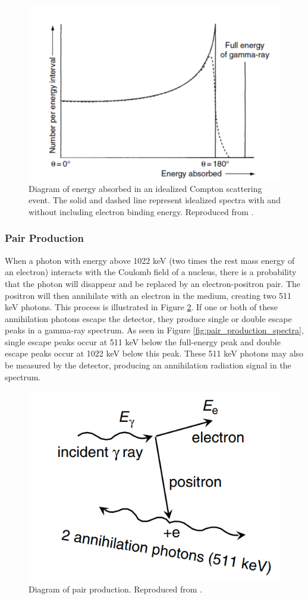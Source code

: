 \begin{figure}[H]
\centering
\includegraphics[width=0.75\linewidth]{images/ideal_compton}
\caption{Diagram of energy absorbed in an idealized Compton scattering event. The solid and dashed line represent idealized spectra with and without including electron binding energy. Reproduced from \cite{gilmore}.}
\label{fig:ideal_compton}
\end{figure}



\subsubsection{Pair Production}

When a photon with energy above 1022 keV (two times the rest mass energy of an electron) interacts with the Coulomb field of a nucleus, there is a probability that the photon will disappear and be replaced by an electron-positron pair. The positron will then annihilate with an electron in the medium, creating two 511 keV photons. This process is illustrated in Figure \ref{fig:pair_production}. If one or both of these annihilation photons escape the detector, they produce single or double escape peaks in a gamma-ray spectrum. As seen in Figure \ref{fig:pair_production_spectra}, single escape peaks occur at 511 keV below the full-energy peak and double escape peaks occur at 1022 keV below this peak. These 511 keV photons may also be measured by the detector, producing an annihilation radiation signal in the spectrum.

\begin{figure}[H]
\centering
\includegraphics[width=0.6\linewidth]{images/pair_production}
\caption{Diagram of pair production. Reproduced from \cite{gilmore}.}
\label{fig:pair_production}
\end{figure}

